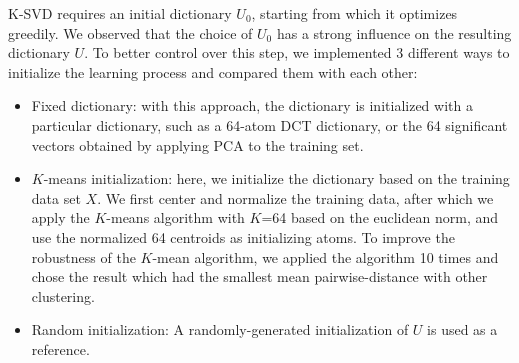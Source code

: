 K-SVD requires an initial dictionary $U_0$, starting from which it optimizes greedily. We observed that the choice of $U_0$ has a strong influence on the resulting dictionary $U$. To better control over this step, we implemented 3 different ways to initialize the learning process and compared them with each other:
\begin{itemize}
   \item Fixed dictionary: with this approach, the dictionary is initialized with a particular dictionary, such as a 64-atom DCT dictionary, or the 64 significant vectors obtained by applying PCA to the training set.  
   \item $K$-means initialization: here, we initialize the dictionary based on the training data set $X$. We first center and normalize the training data, after which we apply the $K$-means algorithm with $K$=64 based on the euclidean norm, and use the normalized 64 centroids as initializing atoms. To improve the robustness of the $K$-mean algorithm, we applied the algorithm 10 times and chose the result which had the smallest mean pairwise-distance with other clustering. 
   \item Random initialization: A randomly-generated initialization of $U$ is used as a reference. 
\end{itemize}

